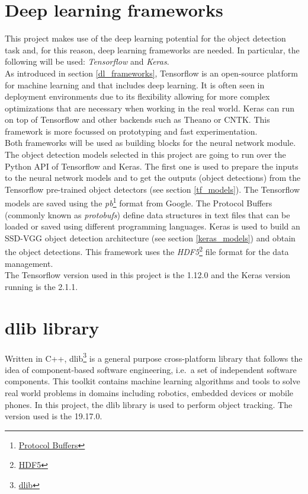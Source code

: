 \section{Deep learning frameworks}
This project makes use of the deep learning potential for the object detection task and, for this reason, deep learning frameworks are needed. In particular, the following will be used: \textit{Tensorflow} and \textit{Keras}.\\
As introduced in section \ref{dl_frameworks}, Tensorflow is an open-source platform for machine learning and that includes deep learning. It is often seen in deployment environments due to its flexibility allowing for more complex optimizations that are necessary when working in the real world. Keras can run on top of Tensorflow and other backends such as Theano or CNTK. This framework is more focussed on prototyping and fast experimentation.\\
Both frameworks will be used as building blocks for the neural network module. The object detection models selected in this project are going to run over the Python API of Tensorflow and Keras. The first one is used to prepare the inputs to the neural network models and to get the outputs (object detections) from the Tensorflow pre-trained object detectors (see section \ref{tf_models}). The Tensorflow models are saved using the \textit{pb}\footnote{\href{https://developers.google.com/protocol-buffers/?hl=en}{Protocol Buffers}} format from Google. The Protocol Buffers (commonly known as \textit{protobufs}) define data structures in text files that can be loaded or saved using different programming languages. Keras is used to build an SSD-VGG object detection architecture (see section \ref{keras_models}) and obtain the object detections. This framework uses the \textit{HDF5}\footnote{\href{https://www.hdfgroup.org/solutions/hdf5/}{HDF5}} file format for the data management.\\
The Tensorflow version used in this project is the 1.12.0 and the Keras version running is the 2.1.1.

\section{dlib library}
Written in C++, dlib\footnote {\href{http://dlib.net/}{dlib}} is a general purpose cross-platform library that follows the idea of component-based software engineering, i.e.\ a set of independent software components. This toolkit contains machine learning algorithms and tools to solve real world problems in domains including robotics, embedded devices or mobile phones. In this project, the dlib library is used to perform object tracking. The version used is the 19.17.0.

